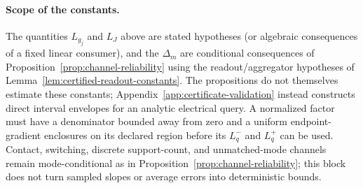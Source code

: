 \paragraph{Scope of the constants.}
The quantities $L_{g_j}$ and $L_J$ above are stated hypotheses (or algebraic
consequences of a fixed linear consumer), and the $\Delta_m$ are conditional
consequences of Proposition~\ref{prop:channel-reliability} using the
readout/aggregator hypotheses of
Lemma~\ref{lem:certified-readout-constants}. The propositions do not themselves
estimate these constants; Appendix~\ref{app:certificate-validation} instead
constructs direct interval envelopes for an analytic electrical query. A
normalized factor must have a denominator bounded away from zero and a
uniform endpoint-gradient enclosures on its declared region before its
$L_q^-$ and $L_q^+$ can be used. Contact, switching, discrete support-count, and unmatched-mode channels
remain mode-conditional as in Proposition~\ref{prop:channel-reliability}; this
block does not turn sampled slopes or average errors into deterministic bounds.




